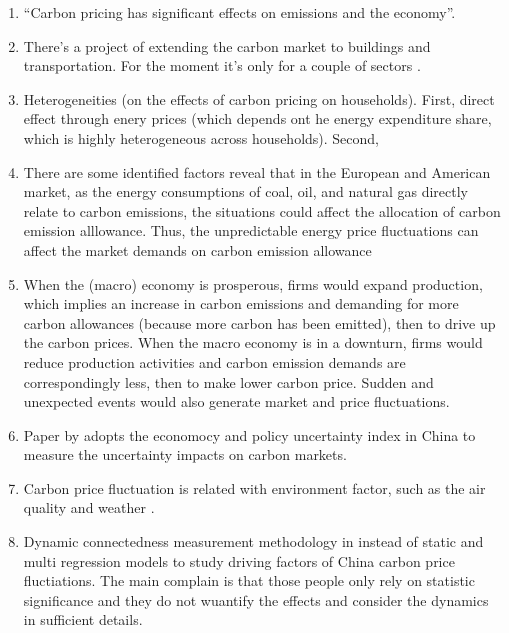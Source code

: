 \begin{enumerate}[wide, itemsep=0cm, topsep=0cm, label=\textbf{\arabic{enumi}.}]
	\item ``Carbon pricing has significant effects on emissions and the economy''.
	
	\item There's a project of extending the carbon market to buildings and transportation. For the moment it's only for a couple of sectors \cite{eu2021carbon}.
	
	\item Heterogeneities (on the effects of carbon pricing on households). First, direct effect through enery prices (which depends ont he energy expenditure share, which is highly heterogeneous across households). Second, 
	
	\item There are some identified factors reveal that in the European and American market, as the energy consumptions of coal, oil, and natural gas directly relate to carbon emissions, the situations could affect the allocation of carbon emission alllowance. Thus, the unpredictable energy price fluctuations can affect the market demands on carbon emission allowance \cite{wen2022china, chevalier2012correlations}
	
	\item When the (macro) economy is prosperous, firms would expand production, which implies an increase in carbon emissions and demanding for more carbon allowances (because more carbon has been emitted), then to drive up the carbon prices. When the macro economy is in a downturn, firms would reduce production activities and carbon emission demands are correspondingly less, then to make lower carbon price. Sudden and unexpected events would also generate market and price fluctuations. \cite{wen2022china}
	
	\item Paper by \cite{wen2022china} adopts the economocy and policy uncertainty index in China to measure the uncertainty impacts on carbon markets. 
	
	\item Carbon price fluctuation is related with environment factor, such as the air quality and weather \cite{perera2020quantifying}.
	
	\item Dynamic connectedness measurement methodology in \cite{wen2022china} instead of static and multi regression models to study driving factors of China carbon price fluctiations. The main complain is that those people only rely on statistic significance and they do not wuantify the effects and consider the dynamics in sufficient details. 
	

\end{enumerate}
